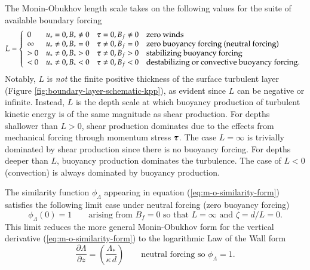 The Monin-Obukhov length scale takes on the following values for the
suite of available boundary forcing
\begin{equation}
  L = \left\{ 
  \begin{array}{llll}
   0       &u_{*}=0, B_{*} \ne 0    &\mbox{\boldmath $\tau$} = 0, B_{f} \ne 0  &\mbox{zero winds}
  \\
   \infty &u_{*} \ne 0, B_{*}= 0  &\mbox{\boldmath $\tau$} \ne 0, B_{f} = 0 &\mbox{zero buoyancy forcing (neutral forcing)}
 \\
  >0     &u_{*} \ne 0, B_{*} > 0  &\mbox{\boldmath $\tau$} \ne 0, B_{f} > 0  &\mbox{stabilizing buoyancy forcing}
\\
  <0     &u_{*} \ne 0, B_{*} < 0  &\mbox{\boldmath $\tau$} \ne 0, B_{f} < 0 &\mbox{destabilizing or convective buoyancy forcing.}
\end{array}
 \right.
\label{eq:regimes-for-m-o-length}
\end{equation}
Notably, $L$ is {\it not} the finite positive thickness of the surface
turbulent layer (Figure \ref{fig:boundary-layer-schematic-kpp}), as
evident since $L$ can be negative or infinite.  Instead, $L$ is the
depth scale at which buoyancy production of turbulent kinetic energy
is of the same magnitude as shear production.  For depths shallower
than $L>0$, shear production dominates due to the effects from
mechanical forcing through momentum stress $\mbox{\boldmath $\tau$}$. The case
$L=\infty$ is trivially dominated by shear production since there is
no buoyancy forcing.  For depths deeper than $L$, buoyancy production
dominates the turbulence.  The case of $L < 0$ (convection) is always
dominated by buoyancy production.

The similarity function $\phi_{\Lambda}$ appearing in equation
(\ref{eq:m-o-similarity-form}) satisfies the following limit case
under neutral forcing (zero buoyancy forcing)
\begin{equation}
  \phi_{\Lambda}(0) = 1 \qquad \mbox{arising from $B_{f} = 0$ so that $L=\infty$ and $\zeta = d/L = 0$.} 
\end{equation}
This limit reduces the more general Monin-Obukhov form for the
vertical derivative (\ref{eq:m-o-similarity-form}) to the logarithmic
Law of the Wall form 
\begin{equation}
     \frac{\partial \Lambda}{\partial z} = \left(
    \frac{\Lambda_{*}}{\kappa \, d} \right)  \qquad \mbox{neutral forcing so $\phi_{\Lambda}=1$.}
\label{eq:m-o-similarity-form-neutral}
\end{equation}

